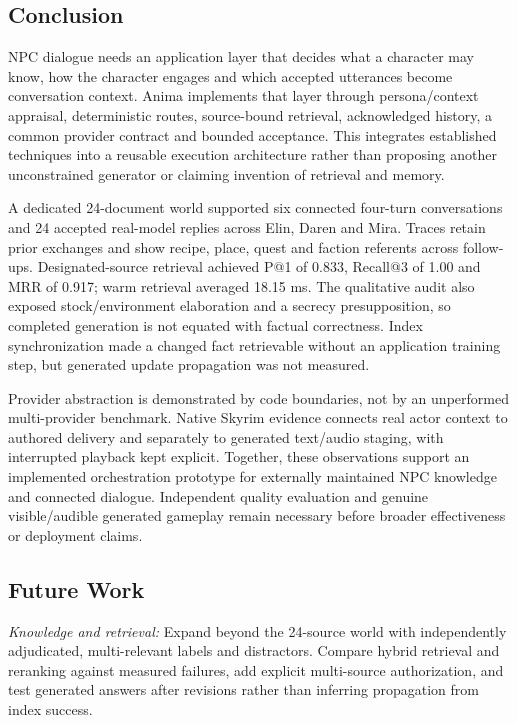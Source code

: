\documentclass[conference]{IEEEtran}
\begin{document}
\subsection{Conclusion}
NPC dialogue needs an application layer that decides what a character may know, how the character engages and which accepted utterances become conversation context. Anima implements that layer through persona/context appraisal, deterministic routes, source-bound retrieval, acknowledged history, a common provider contract and bounded acceptance. This integrates established techniques into a reusable execution architecture rather than proposing another unconstrained generator or claiming invention of retrieval and memory.

A dedicated 24-document world supported six connected four-turn conversations and 24 accepted real-model replies across Elin, Daren and Mira. Traces retain prior exchanges and show recipe, place, quest and faction referents across follow-ups. Designated-source retrieval achieved P@1 of 0.833, Recall@3 of 1.00 and MRR of 0.917; warm retrieval averaged 18.15 ms. The qualitative audit also exposed stock/environment elaboration and a secrecy presupposition, so completed generation is not equated with factual correctness. Index synchronization made a changed fact retrievable without an application training step, but generated update propagation was not measured.

Provider abstraction is demonstrated by code boundaries, not by an unperformed multi-provider benchmark. Native Skyrim evidence connects real actor context to authored delivery and separately to generated text/audio staging, with interrupted playback kept explicit. Together, these observations support an implemented orchestration prototype for externally maintained NPC knowledge and connected dialogue. Independent quality evaluation and genuine visible/audible generated gameplay remain necessary before broader effectiveness or deployment claims.

\subsection{Future Work}
\textit{Knowledge and retrieval:} Expand beyond the 24-source world with independently adjudicated, multi-relevant labels and distractors. Compare hybrid retrieval and reranking against measured failures, add explicit multi-source authorization, and test generated answers after revisions rather than inferring propagation from index success.
\end{document}
